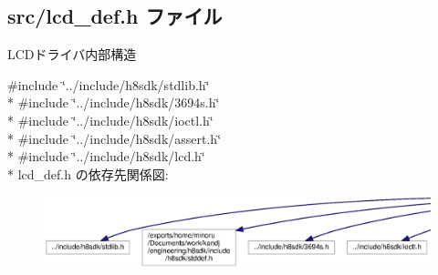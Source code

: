 \subsection{src/lcd\+\_\+def.h ファイル}
\label{lcd__def_8h}


L\+C\+Dドライバ内部構造  


{\ttfamily \#include \char`\"{}../include/h8sdk/stdlib.\+h\char`\"{}}\\*
{\ttfamily \#include \char`\"{}../include/h8sdk/3694s.\+h\char`\"{}}\\*
{\ttfamily \#include \char`\"{}../include/h8sdk/ioctl.\+h\char`\"{}}\\*
{\ttfamily \#include \char`\"{}../include/h8sdk/assert.\+h\char`\"{}}\\*
{\ttfamily \#include \char`\"{}../include/h8sdk/lcd.\+h\char`\"{}}\\*
lcd\+\_\+def.\+h の依存先関係図\+:\nopagebreak
\begin{figure}[H]
\begin{center}
\leavevmode
\includegraphics[width=350pt]{dd/de3/lcd__def_8h__incl}
\end{center}
\end{figure}
